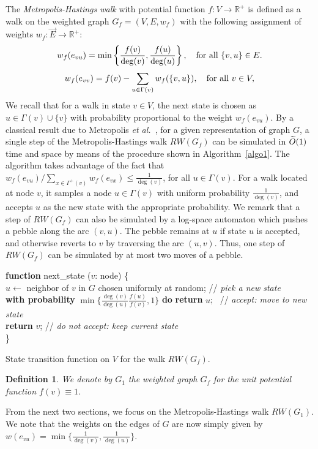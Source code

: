 \documentclass[11pt,a4paper]{article}
\newtheorem{definition}{Definition}
\newcommand{\etal}{\textsl{et al.}\xspace}
\renewcommand{\O}{\ensuremath \widetilde O}
\renewcommand{\*}{\hspace*{5mm}}
\begin{document}
The \emph{Metropolis-Hastings walk} with potential function $f : V \to \mathbb{R}^+$ is defined as a walk on the weighted graph $G_f = (V, E, w_f)$ with the following assignment of weights $w_f : \vec E \to \mathbb{R}^+$:
$$
	w_f(e_{vu}) = \min\left\{\frac{f(v)}{\deg(v)}, \frac{f(u)}{\deg(u)}\right\}, \textrm{\quad for all } \{v,u\}\in E.
$$
$$
	w_f(e_{vv}) = f(v) - \sum_{u\in \Gamma(v)} w_f(\{v,u\}), \textrm{\quad for all } v \in V,
$$
We recall that for a walk in state $v \in V$, the next state is chosen as $u \in \Gamma(v) \cup \{v\}$ with probability proportional to the weight $w_f(e_{vu})$. By a classical result due to Metropolis \etal~\cite{M51}, for a given representation of graph $G$, a single step of the Metropolis-Hastings walk $RW(G_f)$ can be simulated in $\O(1)$ time and space by means of the procedure shown in Algorithm~\ref{algo1}. The algorithm takes advantage of the fact that $w_f(e_{vu}) / \sum_{x\in \Gamma^+(v)} w_f(e_{vx})\leq \frac{1}{\deg (v)}$, for all $u \in \Gamma(v)$. For a walk located at node $v$, it samples a node $u\in \Gamma(v)$ with uniform probability $\frac{1}{\deg (v)}$, and accepts $u$ as the new state with the appropriate probability. We remark that a step of $RW(G_f)$ can  also be simulated by a log-space automaton which pushes a pebble along the arc $(v,u)$. The pebble remains at $u$ if state $u$ is accepted, and otherwise reverts to $v$ by traversing the arc $(u,v)$. Thus, one step of $RW(G_f)$ can be simulated by at most two moves of a pebble.

\IncMargin{0.5em}
\begin{algorithm}
\textbf{function} next\_state ($v$: node) \{\\
\* $u \gets$ neighbor of $v$ in $G$ chosen uniformly at random; \quad// \emph{pick a new state}\\
\* \textbf{with probability} $\min \{\frac{\deg(v)}{\deg(u)}\frac{f(u)}{f(v)}, 1\}$ \textbf{do} \textbf{return} $u$; \ // \emph{accept: move to new state}\\
\* \textbf{return} $v$; \quad// \emph{do not accept: keep current state}\\
\}
\caption{State transition function on $V$ for the walk $RW(G_f)$.
}
\label{algo1}
\end{algorithm}

\begin{definition}
We denote by $G_1$ the weighted graph $G_f$ for the unit potential function $f(v) \equiv 1$.
\end{definition}


From the next two sections, we focus on the Metropolis-Hastings walk $RW(G_1)$. We note that the weights on the edges of $G$ are now simply given by $w(e_{vu}) = \min\{\frac{1}{\deg(v)}, \frac{1}{\deg(u)}\}$.
\end{document}

